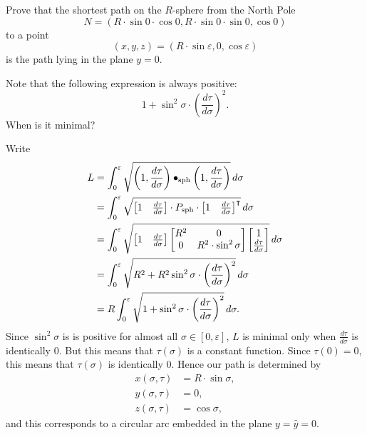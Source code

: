 \documentclass{ximera}
\begin{document}
\begin{problem}
  Prove that the shortest path on the $R$-sphere from the North Pole
  \[
  N=\left( R\cdot \sin 0\cdot  \cos 0,R\cdot \sin  0\cdot \sin 0,\cos
  0\right)
  \]
  to a point
  \[
  (x,y,z)=\left(R\cdot \sin \varepsilon,0,\cos \varepsilon\right)
  \]
  is the path lying in the plane $y=0$.
  \begin{hint}
    Note that the following expression is always positive:
    \[
    1+\sin ^{2}\sigma\cdot \left(\frac{d\tau }{d\sigma}\right)^{2}.
    \]
    When is it minimal?
  \end{hint}

  \begin{freeResponse}
    Write
    \begin{align*}
    L  &=\int_{0}^{\varepsilon} \sqrt{\left(1,\dd[\tau]{\sigma}\right)\bullet_\mathrm{sph} \left(1,\dd[\tau]{\sigma}\right)}\d\sigma\\
    &= \int_{0}^{\varepsilon} \sqrt{
      \begin{bmatrix} 1 & \dd[\tau]{\sigma}
      \end{bmatrix} \cdot P_\mathrm{sph}\cdot
      \begin{bmatrix} 1 & \dd[\tau]{\sigma}
      \end{bmatrix}^\transpose}\d\sigma \\
    &= \int_{0}^{\varepsilon} \sqrt{
      \begin{bmatrix} 1 & \dd[\tau]{\sigma}
      \end{bmatrix}
      \begin{bmatrix}
        R^2 & 0 \\
        0 & R^2\cdot\sin^2 \sigma
      \end{bmatrix}
      \begin{bmatrix} 1 \\ \dd[\tau]{\sigma}
    \end{bmatrix}}\d\sigma \\
    &= \int_{0}^{\varepsilon} \sqrt{
      R^2+R^2\sin^{2}\sigma\cdot \left(\frac{d\tau }{d\sigma}\right)^{2}
    }\d\sigma \\
    &= R\int_{0}^{\varepsilon} \sqrt{
      1+\sin^{2}\sigma\cdot \left(\frac{d\tau }{d\sigma}\right)^{2}
    }\d\sigma.
    \end{align*}
   Since $\sin^{2}\sigma$ is is positive for almost all $\sigma\in[
     0,\varepsilon] $, $L$ is minimal only when
   $\frac{d\tau}{d\sigma}$ is identically $0$. But this means that
   $\tau\left( \sigma\right) $ is a constant function. Since
   $\tau\left( 0\right) =0$, this means that $\tau\left( \sigma\right)
   $ is identically $0$. Hence our path is determined by
   \begin{align*}
     x(\sigma,\tau) &=R\cdot \sin\sigma,\\
     y(\sigma,\tau) &=0,\\
     z(\sigma,\tau) &=\cos \sigma,
   \end{align*}
   and this corresponds to a circular arc embedded in the plane
   $y=\hat{y}=0$.
  \end{freeResponse}

\end{problem}
\end{document}
